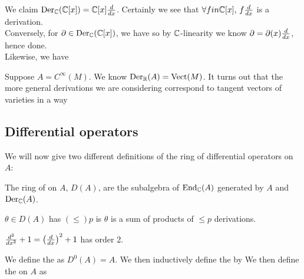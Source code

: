\documentclass{article}
\begin{document}
\begin{example}
We claim $\operatorname{Der}_{\mathbb{C}}(\mathbb{C}[x]) = \mathbb{C}[x] \frac{d}{dx}$. Certainly we see that $\forall f in \mathbb{C}[x], \, f\frac{d}{dx}$ is a derivation. \\ Conversely, for $\partial \in \operatorname{Der}_{\mathbb{C}}(\mathbb{C}[x])$, we have 
so by $\mathbb{C}$-linearity we know $\partial = \partial(x) \frac{d}{dx}$, hence done. \\
Likewise, we have 
\end{example}

\begin{aside}
Suppose $A = C^\infty(M)$. We know $\operatorname{Der}_{\mathbb{R}}(A) = \operatorname{Vect}(M)$. It turns out that the more general derivations we are considering correspond to tangent vectors of varieties in a way
\end{aside}

\subsection{Differential operators}

We will now give two different definitions of the ring of differential operators on $A$:

\begin{definition}
The ring of  on $A$, $D(A)$, are the subalgebra of $\operatorname{End}_{\mathbb{C}}(A)$ generated by $A$ and $\operatorname{Der}_{\mathbb{C}}(A)$. 
\end{definition}

\begin{definition}
$\theta \in D(A)$ has  $(\leq)p$ is $\theta$ is a sum of products of $\leq p$ derivations. 
\end{definition}

\begin{example}
$\frac{d^2}{dx^2} + 1 = \left( \frac{d}{dx} \right)^2+1$ has order 2. 
\end{example}

\begin{definition}
We define the  as $D^0(A)=A$. We then inductively define the  by 
We then define the  on $A$ as 
\end{definition}
\end{document}
